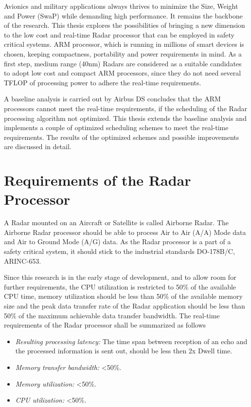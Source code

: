 Avionics and military applications always thrives to minimize the Size, Weight and Power (SwaP) while demanding high performance. It remains the backbone of the research. This thesis explores the possibilities of bringing a new dimension to the low cost and real-time Radar processor that can be employed in safety critical systems. ARM processor, which is running in millions of smart devices\cite{armWeb} is chosen, keeping compactness, portability and power requirements in mind. As a first step, medium range (40nm) Radars are considered as a suitable candidates to adopt low cost and compact ARM processors, since they do not need several TFLOP of processing power to adhere the real-time requirements.

A baseline analysis is carried out by Airbus DS concludes that the ARM processors cannot meet the real-time requirements, if the scheduling of the Radar processing algorithm not optimized. This thesis extends the baseline analysis and implements a couple of optimized scheduling schemes to meet the real-time requirements. The results of the optimized schemes and possible improvements are discussed in detail.

\section{Requirements of the Radar Processor}
\label{sec:intro:realtime_req}
A Radar mounted on an Aircraft or Satellite is called Airborne Radar. The Airborne Radar processor should be able to process Air to Air (A/A) Mode data and Air to Ground Mode (A/G) data. As the Radar processor is a part of a safety critical system, it should stick to the industrial standards DO-178B/C, ARINC-653.

Since this research is in the early stage of development, and to allow room for further requirements, the CPU utilization is restricted to 50\% of the available CPU time, memory utilization should be less than 50\% of the available memory size and the peak data transfer rate of the Radar application should be less than 50\% of the maximum achievable data transfer bandwidth. The real-time requirements of the Radar processor shall be summarized as follows
\begin{itemize}
        \itemsep0em
        \item \textit{Resulting processing latency:} The time span between reception of an echo and the processed information is sent out, should be less then 2x Dwell time.
        \item \textit{Memory transfer bandwidth:} <50\%.
        \item \textit{Memory utilization:} <50\%.
        \item \textit{CPU utilization:} <50\%.
\end{itemize}


